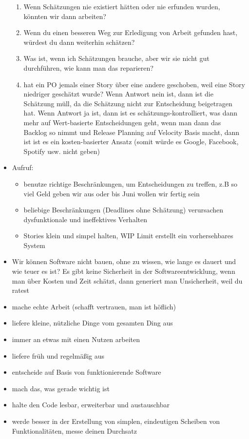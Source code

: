 \begin{itemize}
\begin{enumerate}
      \item Wenn Schätzungen nie existiert hätten oder nie erfunden wurden, könnten wir dann
        arbeiten?
      \item Wenn du einen besseren Weg zur Erledigung von Arbeit gefunden hast, würdest du dann
        weiterhin schätzen?
      \item Was ist, wenn ich Schätzungen brauche, aber wir sie nicht gut durchführen, wie kann
        man das reparieren?
      \item hat ein PO jemals einer Story über eine andere geschoben, weil eine Story niedriger
        geschätzt wurde? Wenn Antwort nein ist, dann ist die Schätzung müll, da die Schätzung
        nicht zur Entscheidung beigetragen hat. Wenn Antwort ja ist, dann ist es
        schätzungs-kontrolliert, was dann mehr auf Wert-basierte Entscheidungen geht,
        wenn man dann das Backlog so nimmt und Release Planning auf Velocity Basis macht,
        dann ist ist es ein kosten-basierter Ansatz (somit würde es Google, Facebook,
        Spotify usw. nicht geben)
    \end{enumerate}
  \item Aufruf:
    \begin{itemize}
      \item benutze richtige Beschränkungen, um Entscheidungen zu treffen, z.B so viel Geld geben
        wir aus oder bis Juni wollen wir fertig sein
      \item beliebige Beschränkungen (Deadlines ohne Schätzung) verursachen
        dysfunktionale und ineffektives Verhalten
      \item Stories klein und simpel halten, WIP Limit erstellt ein vorhersehbares System
    \end{itemize}
  \item Wir können Software nicht bauen, ohne zu wissen, wie lange es dauert und wie teuer es
    ist? Es gibt keine Sicherheit in der Softwareentwicklung, wenn man über Kosten und Zeit
    schätzt, dann generiert man Unsicherheit, weil du ratest
\end{itemize}


\begin{itemize}
  \item mache echte Arbeit (schafft vertrauen, man ist höflich)
  \item liefere kleine, nützliche Dinge vom gesamten Ding aus
  \item immer an etwas mit einen Nutzen arbeiten
  \item liefere früh und regelmäßig aus
  \item entscheide auf Basis von funktionierende Software
  \item mach das, was gerade wichtig ist
  \item halte den Code lesbar, erweiterbar und austauschbar
  \item werde besser in der Erstellung von simplen, eindeutigen Scheiben von Funktionalitäten,
    messe deinen Durchsatz
\end{itemize}


